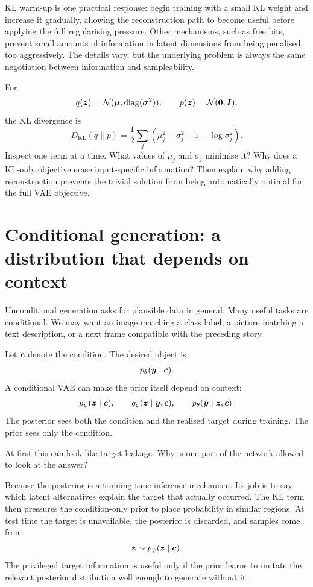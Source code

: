 KL warm-up is one practical response: begin training with a small KL weight and increase it gradually, allowing the reconstruction path to become useful before applying the full regularising pressure. Other mechanisms, such as free bits, prevent small amounts of information in latent dimensions from being penalised too aggressively. The details vary, but the underlying problem is always the same negotiation between information and sampleability.

\begin{optionalexercise}[title={Optional mathematics --- diagonal Gaussian KL}]
For
\[
q(\bm{z})=\mathcal{N}(\bm{\mu},\operatorname{diag}(\bm{\sigma}^2)),
\qquad
p(\bm{z})=\mathcal{N}(\bm{0},\bm{I}),
\]
the KL divergence is
\[
D_{\mathrm{KL}}(q\|p)
=\frac12\sum_j
\left(\mu_j^2+\sigma_j^2-1-\log\sigma_j^2\right).
\]
Inspect one term at a time. What values of \(\mu_j\) and \(\sigma_j\) minimise it? Why does a KL-only objective erase input-specific information? Then explain why adding reconstruction prevents the trivial solution from being automatically optimal for the full VAE objective.
\end{optionalexercise}

\section{Conditional generation: a distribution that depends on context}

Unconditional generation asks for plausible data in general. Many useful tasks are conditional. We may want an image matching a class label, a picture matching a text description, or a next frame compatible with the preceding story.

Let \(\bm{c}\) denote the condition. The desired object is
\[
  p_\theta(\bm{y}\mid\bm{c}).
\]
A conditional VAE can make the prior itself depend on context:
\begin{align}
  p_\psi(\bm{z}\mid\bm{c}),\qquad
  q_\phi(\bm{z}\mid\bm{y},\bm{c}),\qquad
  p_\theta(\bm{y}\mid\bm{z},\bm{c}).
\end{align}
The posterior sees both the condition and the realised target during training. The prior sees only the condition.

At first this can look like target leakage. Why is one part of the network allowed to look at the answer?

Because the posterior is a training-time inference mechanism. Its job is to say which latent alternatives explain the target that actually occurred. The KL term then pressures the condition-only prior to place probability in similar regions. At test time the target is unavailable, the posterior is discarded, and samples come from
\[
  \bm{z}\sim p_\psi(\bm{z}\mid\bm{c}).
\]
The privileged target information is useful only if the prior learns to imitate the relevant posterior distribution well enough to generate without it.

